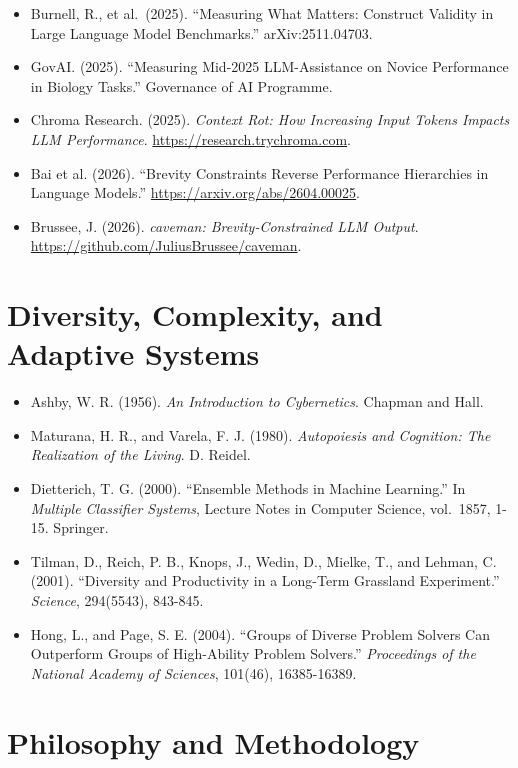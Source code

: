 \documentclass[12pt]{article}
\providecommand{\tightlist}{\setlength{\itemsep}{0pt}\setlength{\parskip}{0pt}}
\begin{document}
\begin{itemize}
\tightlist
\item
  Burnell, R., et al.~(2025). ``Measuring What Matters: Construct
  Validity in Large Language Model Benchmarks.'' arXiv:2511.04703.
\item
  GovAI. (2025). ``Measuring Mid-2025 LLM-Assistance on Novice
  Performance in Biology Tasks.'' Governance of AI Programme.
\item
  Chroma Research. (2025). \emph{Context Rot: How Increasing Input
  Tokens Impacts LLM Performance}. \url{https://research.trychroma.com}.
\item
  Bai et al. (2026). ``Brevity Constraints Reverse Performance
  Hierarchies in Language Models.'' \url{https://arxiv.org/abs/2604.00025}.
\item
  Brussee, J. (2026). \textit{caveman: Brevity-Constrained LLM Output}.
  \url{https://github.com/JuliusBrussee/caveman}.
\end{itemize}

\section{Diversity, Complexity, and Adaptive
Systems}\label{diversity-complexity-and-adaptive-systems}

\begin{itemize}
\tightlist
\item
  Ashby, W. R. (1956). \emph{An Introduction to Cybernetics}. Chapman
  and Hall.
\item
  Maturana, H. R., and Varela, F. J. (1980). \emph{Autopoiesis and
  Cognition: The Realization of the Living}. D. Reidel.
\item
  Dietterich, T. G. (2000). ``Ensemble Methods in Machine Learning.'' In
  \emph{Multiple Classifier Systems}, Lecture Notes in Computer Science,
  vol.~1857, 1-15. Springer.
\item
  Tilman, D., Reich, P. B., Knops, J., Wedin, D., Mielke, T., and
  Lehman, C. (2001). ``Diversity and Productivity in a Long-Term
  Grassland Experiment.'' \emph{Science}, 294(5543), 843-845.
\item
  Hong, L., and Page, S. E. (2004). ``Groups of Diverse Problem Solvers
  Can Outperform Groups of High-Ability Problem Solvers.''
  \emph{Proceedings of the National Academy of Sciences}, 101(46),
  16385-16389.
\end{itemize}

\section{Philosophy and
Methodology}\label{philosophy-and-methodology}
\end{document}
